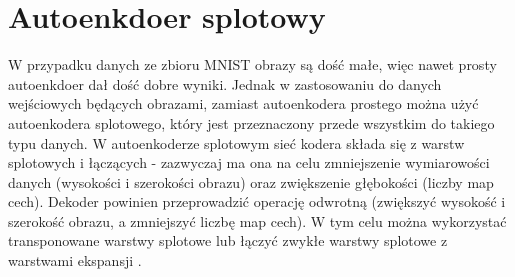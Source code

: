 \documentclass[12pt]{mwbk}
\theoremstyle{plain}
\theoremstyle{definition}
\theoremstyle{remark}
\begin{document}
\section{Autoenkdoer splotowy}

W przypadku danych ze zbioru MNIST obrazy są dość małe, więc nawet prosty autoenkdoer dał dość dobre wyniki.
Jednak w zastosowaniu do danych wejściowych będących obrazami, zamiast autoenkodera prostego można użyć autoenkodera splotowego, który jest przeznaczony przede wszystkim do takiego typu danych. W autoenkoderze splotowym sieć kodera składa się z warstw splotowych i łączących - zazwyczaj ma ona na celu zmniejszenie wymiarowości danych (wysokości i szerokości obrazu) oraz zwiększenie głębokości (liczby map cech). Dekoder powinien przeprowadzić operację odwrotną (zwiększyć wysokość i szerokość obrazu, a zmniejszyć liczbę map cech). W tym celu można wykorzystać transponowane warstwy splotowe lub łączyć zwykłe warstwy splotowe z warstwami ekspansji \cite{geron}.
\end{document}
